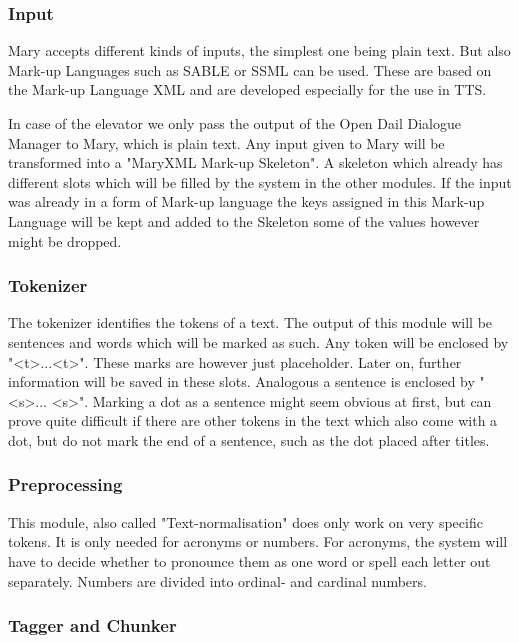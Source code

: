 \documentclass[a4paper, 12pt]{article}
\begin{document}
\subsubsection*{Input}

Mary accepts different kinds of inputs, the simplest one being plain text.
But also Mark-up Languages such as SABLE or SSML can be used. 
These are based on the Mark-up Language XML and are developed especially for the use in TTS.

In case of the elevator we only pass the output of the Open Dail Dialogue Manager to Mary, which is plain text.
Any input given to Mary will be transformed into a "MaryXML Mark-up Skeleton". 
A skeleton which already has different slots which will be filled by the system in the other modules.
If the input was already in a form of Mark-up language the keys assigned in this Mark-up Language will be kept and added to the Skeleton some of the values however might be dropped.

\subsubsection*{Tokenizer}

The tokenizer identifies the tokens of a text. The output of this module will be sentences and words which will be marked as such.
Any token will be enclosed by "\textless t\textgreater ...\textless  t\textgreater". 
These marks are however just placeholder. 
Later on, further information will be saved in these slots.
Analogous a sentence is enclosed by "\textless s\textgreater ... \textless s\textgreater". 
Marking a dot as a sentence might seem obvious at first, but can prove quite difficult if there are other tokens in the text which also come with a dot, but do not mark the end of a sentence, such as the dot placed after titles.

\subsubsection*{Preprocessing}

This module, also called "Text-normalisation" does only work on very specific tokens.
It is only needed for acronyms or numbers.
For acronyms, the system will have to decide whether to pronounce them as one word or spell each letter out separately.
Numbers are divided into ordinal- and cardinal numbers.

\subsubsection*{Tagger and Chunker}
\end{document}
